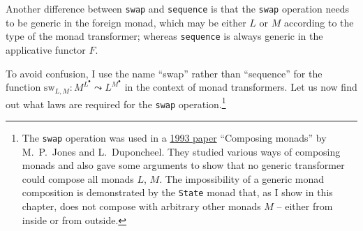 Another difference between \lstinline!swap!
and \lstinline!sequence!
is that the \texttt{}\lstinline!swap!
operation needs to be generic in the foreign monad, which may be either
$L$ or $M$ according to the type of the monad transformer; whereas
\lstinline!sequence! is
always generic in the applicative functor $F$. %
\begin{comment}
\emph{This is actually confusing! Let's not do this and always write
$\text{sw}_{L}^{M}:M^{L^{A}}\Rightarrow L^{M^{A}}$}

To denote more clearly the monad with respect to which \inputencoding{latin9}\lstinline!swap!\inputencoding{utf8}
is generic, we may write
\begin{align*}
\text{sw}_{L}^{M}:L^{M^{A}}\Rightarrow M^{L^{A}}\quad & \text{for the composed-inside transformers,}\\
\text{sw}_{L}^{M}:M^{L^{A}}\Rightarrow L^{M^{A}}\quad & \text{for the composed-outside transformers.}
\end{align*}
The superscript $M$ in $\text{sw}_{L}^{M}$ shows that $M$ is a
\emph{type parameter} in \inputencoding{latin9}\lstinline!swap!\inputencoding{utf8};
that is, \inputencoding{latin9}\lstinline!swap!\inputencoding{utf8}
is generic in the monad $M$. The subscript $L$ in $\text{sw}_{L}^{M}$
shows that the implementations of \inputencoding{latin9}\lstinline!swap!\inputencoding{utf8}
may need to use completely different code for different monads $L$.
\end{comment}

To avoid confusion, I use the name ``swap'' rather than ``sequence''
for the function $\text{sw}_{L,M}:M^{L^{\bullet}}\leadsto L^{M^{\bullet}}$
in the context of monad transformers. Let us now find out what laws
are required for the \texttt{}\lstinline!swap!
operation.\footnote{The \lstinline!swap! operation
was used in a \href{http://web.cecs.pdx.edu/~mpj/pubs/composing.html}{1993 paper}
``Composing monads'' by M.~P.~Jones and L.~Duponcheel. They studied
various ways of composing monads and also gave some arguments to show
that no generic transformer could compose all monads $L$, $M$. The
impossibility of a generic monad composition is demonstrated by the
\lstinline!State! monad
that, as I show in this chapter, does not compose with arbitrary other
monads $M$ – either from inside or from outside.}

